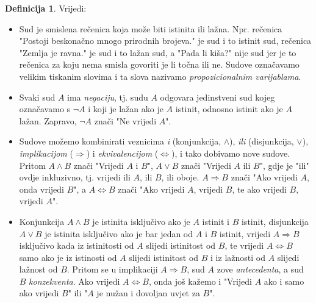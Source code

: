 \documentclass{book}
\theoremstyle{definition}
\theoremstyle{definition}
\newtheorem{definition}{Definicija}
\theoremstyle{remark}
\begin{document}
\begin{definition} Vrijedi:
\label{first}
\begin{itemize}

\item Sud je smislena rečenica koja može biti istinita ili lažna. Npr. rečenica "Postoji beskonačno mnogo prirodnih brojeva." je sud i to istinit sud, rečenica "Zemlja je ravna." je sud i to lažan sud, a "Pada li kiša?" nije sud jer je to rečenica za koju nema smisla govoriti je li točna ili ne. Sudove označavamo velikim tiskanim slovima i ta slova nazivamo \textit{propozicionalnim varijablama}.
\item Svaki sud $A$ ima \textit{negaciju}, tj. sudu $A$ odgovara jedinstveni sud kojeg označavamo s $\neg A$ i koji je lažan ako je $A$ istinit, odnosno istinit ako je $A$ lažan. Zapravo, $\neg A$ znači "Ne vrijedi $A$".
\item Sudove možemo kombinirati veznicima \textit{i} (konjunkcija, $\wedge$), \textit{ili} (disjunkcija, $\vee$), \textit{implikacijom} ($\Rightarrow$) i \textit{ekvivalencijom} ($\Leftrightarrow$), i tako dobivamo nove sudove. Pritom $A\wedge B$ znači "Vrijedi $A$ i $B$", $A\vee B$ znači "Vrijedi $A$ ili $B$", gdje je "ili" ovdje inkluzivno, tj. vrijedi ili $A$, ili $B$, ili oboje. $A\Rightarrow B$ znači "Ako vrijedi $A$, onda vrijedi $B$", a $A\Leftrightarrow B$ znači "Ako vrijedi $A$, vrijedi $B$, te ako vrijedi $B$, vrijedi $A$".
\item Konjunkcija $A\wedge B$ je istinita isključivo ako je $A$ istinit i $B$ istinit, disjunkcija $A\vee B$ je istinita isključivo ako je bar jedan od $A$ i $B$ istinit, vrijedi $A\Rightarrow B$ isključivo kada iz istinitosti od $A$ slijedi istinitost od $B$, te vrijedi $A\Leftrightarrow B$ samo ako je iz istinosti od $A$ slijedi istinitost od $B$ i iz lažnosti od $A$ slijedi lažnost od $B$. Pritom se u implikaciji $A\Rightarrow B$, sud $A$ zove \textit{antecedenta}, a sud $B$ \textit{konzekventa}. Ako vrijedi $A\Leftrightarrow B$, onda još kažemo i "Vrijedi $A$ ako i samo ako vrijedi $B$" ili "$A$ je nužan i dovoljan uvjet za $B$".
\end{itemize}
\end{definition}
\end{document}

